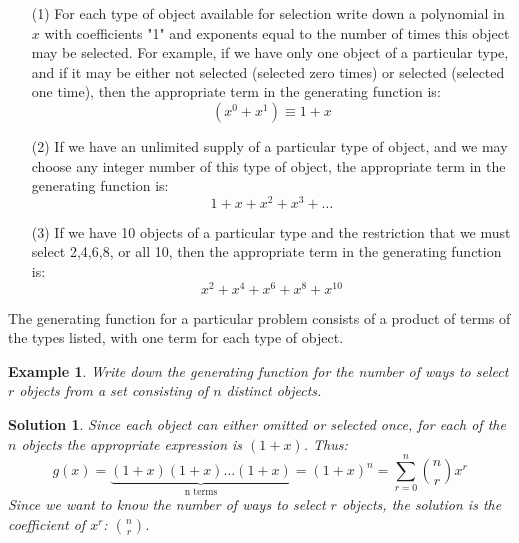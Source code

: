 \documentclass[12pt, letterpaper, onecolumn, conference, final]{IEEEtran}
\theoremstyle{definition}
\theoremstyle{plain}
\newtheorem{example}{Example}[section]
\newtheorem{solution}{Solution}[section]
\begin{document}
\begin{itemize}

\vspace{.2cm}
\item[(1)]
For each type of object available for selection write down a polynomial in $x$ with coefficients "1" and exponents equal to the number of times this object may be selected. For example, if we have only one object of a particular type, and if it may be either not selected (selected zero times) or selected (selected one time), then the appropriate term in the generating function is:
\begin{equation*}
(x^0 + x^1) \equiv 1 + x
\end{equation*}

\vspace{.2cm}
\item[(2)]
If we have an unlimited supply of a particular type of object, and we may choose any integer number of this type of object, the appropriate term in the generating function is:
\begin{equation*}
1 + x + x^2 + x^3 + \dots
\end{equation*}

\vspace{.2cm}
\item[(3)]
If we have 10 objects of a particular type and the restriction that we must select 2,4,6,8, or all 10, then the appropriate term in the generating function is:
\begin{equation*}
x^2 + x^4 + x^6 + x^8 + x^10
\end{equation*}

\end{itemize}
The generating function for a particular problem consists of a product of terms of the types listed, with one term for each type of object.

\begin{example}
Write down the generating function for the number of ways to select $r$ objects from a set consisting of $n$ distinct objects.
\end{example}
\begin{solution}
Since each object can either omitted or selected once, for each of the $n$ objects the appropriate expression is $(1+x)$. Thus:
\begin{equation*}
g(x) = \underbrace{(1+x)(1+x)\dots(1+x)}_{\text{n terms}} = (1+x)^n = \sum_{r=0}^n {n \choose r} x^r
\end{equation*}
Since we want to know the number of ways to select $r$ objects, the solution is the coefficient of $x^r$: ${n \choose r}$.
\end{solution}
\end{document}
